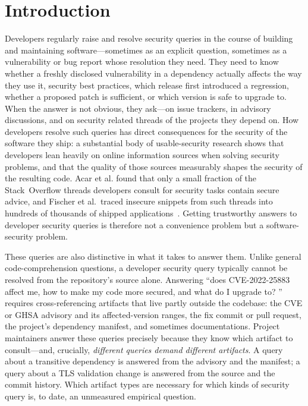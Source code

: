 \section{Introduction}
\label{sec:intro}

Developers regularly raise and resolve security queries in the course of building and maintaining software---sometimes as an explicit question, sometimes as a vulnerability or bug report whose resolution they need. They need to know whether a freshly disclosed vulnerability in a dependency actually affects the way they use it, security best practices, which release first introduced a regression, whether a proposed patch is sufficient, or which version is safe to upgrade to. When the answer is not obvious, they ask---on issue trackers, in advisory discussions, and on security related threads of the projects they depend on. How developers resolve such queries has direct consequences for the security of the software they ship: a substantial body of usable-security research shows that developers lean heavily on online information sources when solving security problems, and that the quality of those sources measurably shapes the security of the resulting code. Acar et al. \cite{acar2016information} found that only a small fraction of the Stack~Overflow threads developers consult for security tasks contain secure advice, and Fischer et al.\ traced insecure snippets from such threads into hundreds of thousands of shipped applications~\cite{fischer2017stackoverflow}. Getting trustworthy answers to developer security queries is therefore not a convenience problem but a software-security problem.

These queries are also distinctive in what it takes to answer them. Unlike general code-comprehension questions, a developer security query typically cannot be resolved from the repository's source alone. Answering ``does CVE-2022-25883 affect me, how to make my code more secured, and what do I upgrade to? '' requires cross-referencing artifacts that live partly outside the codebase: the CVE or GHSA advisory and its affected-version ranges, the fix commit or pull request, the project's dependency manifest, and sometimes documentations. Project maintainers answer these queries precisely because they know which artifact to consult---and, crucially, \emph{different queries demand different artifacts}. A query about a transitive dependency is answered from the advisory and the manifest; a query about a TLS validation change is answered from the source and the commit history. Which artifact types are necessary for which kinds of security query is, to date, an unmeasured empirical question.

